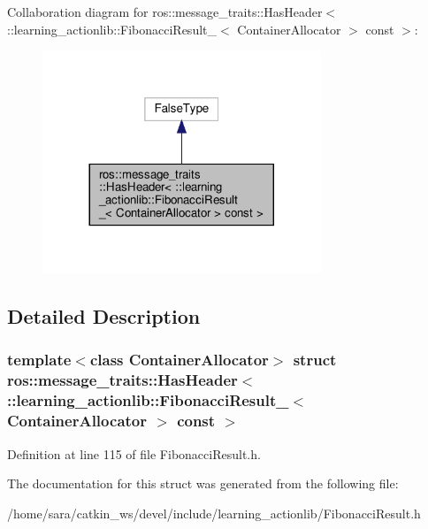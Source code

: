 Collaboration diagram for ros\+:\+:message\+\_\+traits\+:\+:Has\+Header$<$ \+:\+:learning\+\_\+actionlib\+:\+:Fibonacci\+Result\+\_\+$<$ Container\+Allocator $>$ const $>$\+:
\nopagebreak
\begin{figure}[H]
\begin{center}
\leavevmode
\includegraphics[width=236pt]{structros_1_1message__traits_1_1HasHeader_3_01_1_1learning__actionlib_1_1FibonacciResult___3_01Cb89e1c639d3cc6aeb30763612791224e}
\end{center}
\end{figure}


\subsection{Detailed Description}
\subsubsection*{template$<$class Container\+Allocator$>$\newline
struct ros\+::message\+\_\+traits\+::\+Has\+Header$<$ \+::learning\+\_\+actionlib\+::\+Fibonacci\+Result\+\_\+$<$ Container\+Allocator $>$ const $>$}



Definition at line 115 of file Fibonacci\+Result.\+h.



The documentation for this struct was generated from the following file\+:\begin{DoxyCompactItemize}
\item 
/home/sara/catkin\+\_\+ws/devel/include/learning\+\_\+actionlib/Fibonacci\+Result.\+h\end{DoxyCompactItemize}
